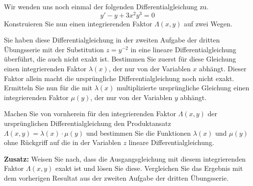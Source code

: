 \begin{atiTask}[
  title = Konstruktion eines integrierenden Faktors
]
  Wir wenden uns noch einmal der folgenden Differentialgleichung zu.
  \[
     y' - y + 3x^2y^3 = 0
  \]
  Konstruieren Sie nun einen integrierenden Faktor $\Lambda(x,y)$ auf zwei Wegen.
  \begin{atiSubtasks}
    \item{
      Sie haben diese Differentialgleichung in der zweiten Aufgabe der dritten Übungsserie mit der Substitution $z = y^{-2}$ in eine lineare Differentialgleichung überführt, die auch nicht exakt ist.
      Bestimmen Sie zuerst für diese Gleichung einen integrierenden Faktor $\lambda(x)$, der nur von der Variablen $x$ abhängt.
      Dieser Faktor allein macht die ursprüngliche Differentialgleichung noch nicht exakt.
      Ermitteln Sie nun für die mit $\lambda(x)$ multiplizierte ursprüngliche Gleichung einen integrierenden Faktor $\mu(y)$, der nur von der Variablen $y$ abhängt.
    }
    \item{
      Machen Sie von vornherein für den integrierenden Faktor $\Lambda(x,y)$ der ursprünglichen Differentialgleichung den Produktansatz $\Lambda(x,y)=\lambda(x)\cdot\mu(y)$ und bestimmen Sie die Funktionen $\lambda(x)$ und $\mu(y)$ ohne Rückgriff auf die in der Variablen $z$ lineare Differentialgleichung.
    }
    \item{
      \textbf{Zusatz:}
      Weisen Sie nach, dass die Ausgangsgleichung mit diesem integrierenden Faktor $\Lambda(x,y)$ exakt ist und lösen Sie diese.
      Vergleichen Sie das Ergebnis mit dem vorherigen Resultat aus der zweiten Aufgabe der dritten Übungsserie.
    }
  \end{atiSubtasks}
\end{atiTask}
